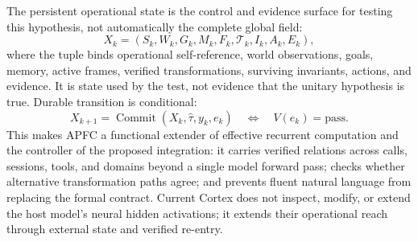 \documentclass[10pt,twocolumn]{article}
\theoremstyle{definition}
\theoremstyle{plain}
\theoremstyle{remark}
\begin{document}
The persistent operational state is the control and evidence surface for testing this hypothesis, not automatically the complete global field:
\begin{equation}
X_k=(S_k,W_k,G_k,M_k,F_k,\mathcal{T}_k,I_k,A_k,E_k),
\label{eq:cognitive-unity}
\end{equation}
where the tuple binds operational self-reference, world observations, goals, memory, active frames, verified transformations, surviving invariants, actions, and evidence.  It is state used by the test, not evidence that the unitary hypothesis is true.  Durable transition is conditional:
\begin{equation}
X_{k+1}=\operatorname{Commit}(X_k,\widehat{\tau},y_k,e_k)
\quad\Longleftrightarrow\quad V(e_k)=\mathrm{pass}.
\label{eq:unity-commit}
\end{equation}
This makes APFC a functional extender of effective recurrent computation and the controller of the proposed integration: it carries verified relations across calls, sessions, tools, and domains beyond a single model forward pass; checks whether alternative transformation paths agree; and prevents fluent natural language from replacing the formal contract.  Current Cortex does not inspect, modify, or extend the host model's neural hidden activations; it extends their operational reach through external state and verified re-entry.
\end{document}
